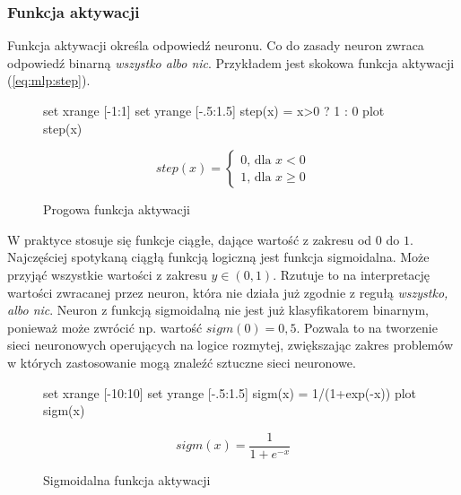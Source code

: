 \documentclass[a4paper,12pt,twoside,openany]{report}
\newcommand{\Eq}[1]{(\ref{#1})}
\begin{document}
\subsubsection{Funkcja aktywacji}
Funkcja aktywacji określa odpowiedź neuronu.
Co do zasady neuron zwraca odpowiedź binarną \textit{wszystko albo nic}.
Przykładem jest skokowa funkcja aktywacji \Eq{eq:mlp:step}.
\begin{figure}[h]
	\label{wyk:mlp:step}
	\centering
	\begin{gnuplot}[terminal=pdf,terminaloptions=color]
		set xrange [-1:1] 
		set yrange [-.5:1.5]
		step(x) = x>0 ? 1 : 0
		plot step(x)
	\end{gnuplot}
	\begin{equation}
		step(x)={\begin{cases}0{\text{, dla }}x<0\\1{\text{, dla }}x\geq 0\end{cases}}
	\end{equation}
	\caption{Progowa funkcja aktywacji}
\end{figure}

W praktyce stosuje się funkcje ciągłe, dające wartość z zakresu od $0$ do $1$.
Najczęściej spotykaną ciągłą funkcją logiczną jest funkcja sigmoidalna.
Może przyjąć wszystkie wartości z zakresu $y \in (0,1)$.
Rzutuje to na interpretację wartości zwracanej przez neuron,
która nie działa już zgodnie z regułą \textit{wszystko, albo nic}.
Neuron z funkcją sigmoidalną nie jest już klasyfikatorem binarnym, ponieważ może zwrócić np. wartość $sigm(0) = 0,5$.
Pozwala to na tworzenie sieci neuronowych operujących na logice rozmytej,
zwiększając zakres problemów w których zastosowanie mogą znaleźć sztuczne sieci neuronowe.


\begin{figure}[h]
	\label{wyk:mlp:sigm}
	\centering
	\begin{gnuplot}[terminal=pdf,terminaloptions=color]
		set xrange [-10:10] 
		set yrange [-.5:1.5]
		sigm(x) = 1/(1+exp(-x))
		plot sigm(x)
	\end{gnuplot}
	\begin{equation}
		sigm(x)=\frac{1}{1+e^{-x}}
	\end{equation}
	\caption{Sigmoidalna funkcja aktywacji}
\end{figure}
\end{document}
